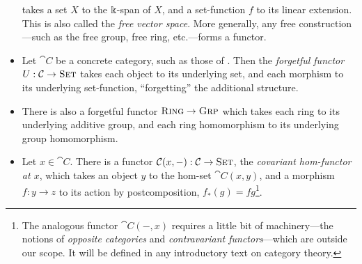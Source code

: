 \begin{ex}
\begin{itemize}
      takes a set $X$ to the $\Bbbk$-span of $X$, and a set-function $f$ to
      its linear extension. This is also called the \emph{free vector space}.
      More generally, any free construction---such as the free group, free ring,
      etc.---forms a functor.
    \item Let $\cat{C}$ be a concrete category, such as those of .
      Then the \emph{forgetful functor} $U: {\mathcal{C}}\to{\textsc{\text{Set}}}$ takes each object to
      its underlying set, and each morphism to its underlying set-function,
      ``forgetting'' the additional structure.
    \item There is also a forgetful functor ${\textsc{\text{Ring}}}\to{\textsc{\text{Grp}}}$ which
      takes each ring to its underlying additive group, and each ring
      homomorphism to its underlying group homomorphism.
    \item Let $x\in\cat{C}$. There is a functor ${\mathcal{C}}(x, -):
      {\mathcal{C}}\to{\textsc{\text{Set}}}$, the \emph{covariant hom-functor at $x$}, which takes an
      object $y$ to the hom-set $\cat{C}(x, y)$, and a morphism $f: y\to z$ to
      its action by postcomposition, $f_*(g) = fg$\footnote{The analogous functor
        $\cat{C}(-, x)$ requires a little bit of machinery---the notions of
      \emph{opposite categories} and \emph{contravariant functors}---which are
    outside our scope. It will be defined in any introductory text on category
    theory.}.
  \end{itemize}
\end{ex}

